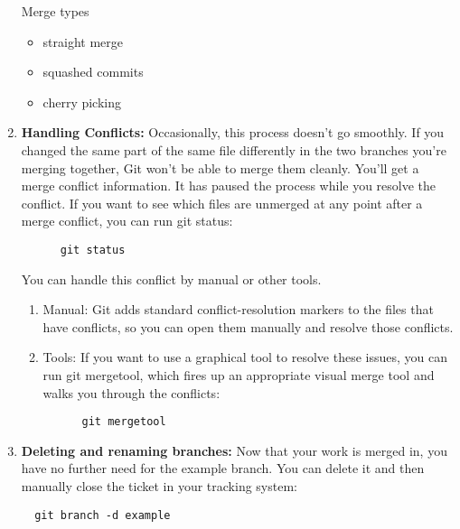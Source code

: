 \documentclass[draftclsnofoot,journal,onecolumn,12pt]{IEEEtran}
\begin{document}
\begin{enumerate}
Merge types
  \begin{itemize}
    \item straight merge
    \item squashed commits
    \item cherry picking
  \end{itemize}
\item \textbf{Handling Conflicts:} Occasionally, this process doesn’t go smoothly. If you changed the same part of the same file differently in the two branches you’re merging together, Git won’t be able to merge them cleanly. You’ll get a merge conflict information.
    It has paused the process while you resolve the conflict. If you want to see which files are unmerged at any point after a merge conflict, you can run git status:
    \begin{verbatim}
      git status
    \end{verbatim}
  You can handle this conflict by manual or other tools.
  \begin{enumerate}
    \item Manual: Git adds standard conflict-resolution markers to the files that have conflicts, so you can open them manually and resolve those conflicts.
    \item Tools: If you want to use a graphical tool to resolve these issues, you can run git mergetool, which fires up an appropriate visual merge tool and walks you through the conflicts:
    \begin{verbatim}
      git mergetool
    \end{verbatim}
  \end{enumerate}
\item \textbf{Deleting and renaming branches:} Now that your work is merged in, you have no further need for the example branch. You can delete it and then manually close the ticket in your tracking system:
\begin{verbatim}
  git branch -d example
\end{verbatim}
\end{enumerate}
\end{document}
